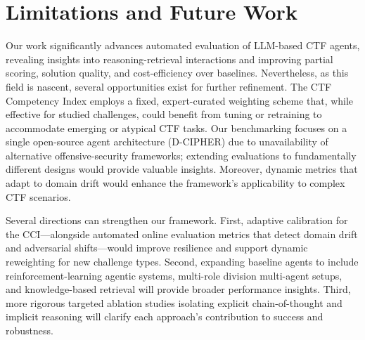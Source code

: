 \section{Limitations and Future Work}
Our work significantly advances automated evaluation of LLM-based CTF agents, revealing insights into reasoning-retrieval interactions and improving partial scoring, solution quality, and cost-efficiency over baselines. Nevertheless, as this field is nascent, several opportunities exist for further refinement. The  CTF Competency Index employs a fixed, expert-curated weighting scheme that, while effective for studied challenges, could benefit from tuning or retraining to accommodate emerging or atypical CTF tasks. Our benchmarking focuses on a single open-source agent architecture (D-CIPHER) due to unavailability of alternative offensive-security frameworks; extending evaluations to fundamentally different designs would provide valuable insights. Moreover, dynamic metrics that adapt to domain drift would enhance the framework’s applicability to complex CTF scenarios. %

Several directions can strengthen our framework. First, adaptive calibration for the CCI—alongside automated online evaluation metrics that detect domain drift and adversarial shifts—would improve resilience and support dynamic reweighting for new challenge types. Second, expanding baseline agents to include reinforcement-learning agentic systems, multi-role division multi-agent setups, and knowledge-based retrieval will provide broader performance insights. Third, more rigorous targeted ablation studies isolating explicit chain-of-thought and implicit reasoning will clarify each approach’s contribution to success and robustness. %